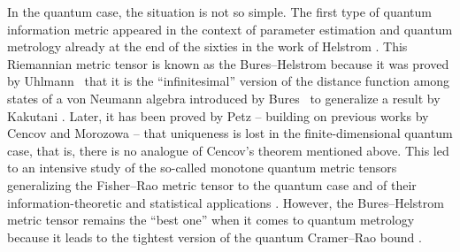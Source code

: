 \documentclass[pdftex]{sigma}
\numberwithin{equation}{section}
\begin{document}
In the quantum case, the situation is not so simple. The first type of quantum information metric appeared in the context of parameter estimation and quantum metrology already at the end of the sixties in the work of Helstrom \cite{Helstrom-1967, Helstrom-1968, Helstrom-1969}.
This Riemannian metric tensor is known as the Bures--Helstrom because it was proved by Uhlmann~\cite{Uhlmann-1976,Uhlmann-1992} that it is the ``infinitesimal'' version of the distance function among states of a von Neumann algebra introduced by Bures~\cite{Bures-1969} to generalize a result by Kakutani \cite{Kakutani-1948}.
Later, it has been proved by Petz \cite{Petz-1996} -- building on previous works by Cencov and Morozowa \cite{C-M-1991} -- that uniqueness is lost in the finite-dimensional quantum case, that is, there is no analogue of Cencov's theorem mentioned above.
This led to an intensive study of the so-called monotone quantum metric tensors generalizing the Fisher--Rao metric tensor to the quantum case \cite{C-DC-L-M-M-V-V-2018,F-K-M-M-S-V-2010,Hasegawa-1995,H-P-1997,L-R-1999,M-M-V-V-2017} and of their information-theoretic and statistical applications \cite{L-Y-L-W-2020,Paris-2009,S-Y-H-2020,T-A-2014,Wootters-1981}.
However, the Bures--Helstrom metric tensor remains the ``best one'' when it comes to quantum metrology because it leads to the tightest version of the quantum Cramer--Rao bound \cite{Fuchs-1996,Paris-2009}.
\end{document}
